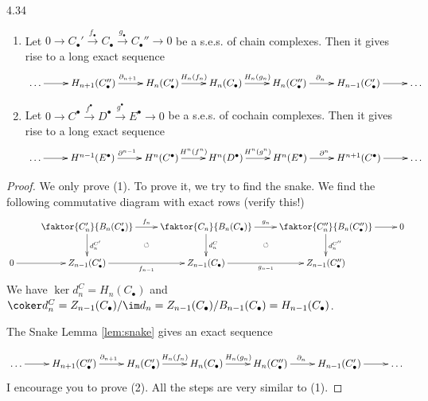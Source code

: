 \documentclass[twoside = false,	%
		headsepline,		%
		parskip = true,
		]{scrbook}						%
\begin{document}
    \begin{proposition}{}{4.34}
        \begin{enumerate}
            \item
                Let $0 \to C_\bullet' \xrightarrow{f_\bullet} C_\bullet \xrightarrow{g_\bullet} C_\bullet'' \to 0$ be a s.e.s. of chain complexes. Then it gives rise to a long exact sequence
                \begin{equation*}
                \xymatrix {
                    \dots \ar[r] & H_{n+1}(C_\bullet'') \ar[r]^{\partial_{n+1}} & H_n(C_\bullet') \ar[r]^{H_n(f_n)} & H_n(C_\bullet) \ar[r]^{H_n(g_n)} & H_n(C_\bullet'') \ar[r]^(.45){\partial_{n}} & H_{n-1}(C_\bullet') \ar[r] & \dots
                }
                \end{equation*}
            \item
                Let $0 \to C^\bullet \xrightarrow{f^\bullet} D^\bullet \xrightarrow{g^\bullet} E^\bullet \to 0 $ be a s.e.s. of cochain complexes. Then it gives rise to a long exact sequence
                \begin{equation*}
                    \xymatrix {
                        \dots \ar[r] & H^{n-1}(E^\bullet) \ar[r]^{\partial^{n-1}} & H^n(C^\bullet) \ar[r]^{H^n(f^n)} & H^n(D^\bullet) \ar[r]^{H^n(g^n)} & H^n(E^\bullet) \ar[r]^{\partial^{n}} & H^{n+1}(C^\bullet) \ar[r] & \dots
                    }
                \end{equation*}
        \end{enumerate}
    \end{proposition}

    \begin{proof}
        We only prove (1). To prove it, we try to find the snake. We find the following commutative diagram with exact rows (verify this!)
        \begin{equation*}
            \xymatrix {
                & \faktor{C_n'}{B_n(C_\bullet')} \ar[r]^{f_n} \ar[d]^{d_n^{C'}} & \faktor{C_n}{B_n(C_\bullet)} \ar[r]^{g_n} \ar[d]^{d_n^C} & \faktor{C_n''}{B_n(C_\bullet'')} \ar[r] \ar[d]^{d_n^{C''}} & 0 \\
                0 \ar[r] & Z_{n-1}(C_\bullet') \ar[r]_{f_{n-1}} \ar@{}[ur]|{\circlearrowleft} & Z_{n-1}(C_\bullet) \ar[r]_{g_{n-1}} \ar@{}[ur]|{\circlearrowleft} & Z_{n-1}(C_\bullet'')
            }
        \end{equation*}
        We have $\ker d_n^{C} = H_n(C_\bullet)$ and $\coker d_n^C = Z_{n-1}(C_\bullet)/\im d_n = Z_{n-1}(C_\bullet)/B_{n-1}(C_\bullet) = H_{n-1}(C_\bullet)$.

        The Snake Lemma \ref{lem:snake} gives an exact sequence

        \begin{equation*}
                \xymatrix {
                    \dots \ar[r] & H_{n+1}(C_\bullet'') \ar[r]^{\partial_{n+1}} & H_n(C_\bullet') \ar[r]^{H_n(f_n)} & H_n(C_\bullet) \ar[r]^{H_n(g_n)} & H_n(C_\bullet'') \ar[r]^(.45){\partial_{n}} & H_{n-1}(C_\bullet') \ar[r] & \dots
                }
                \end{equation*}
        I encourage you to prove (2). All the steps are very similar to (1).
    \end{proof}
\end{document}
